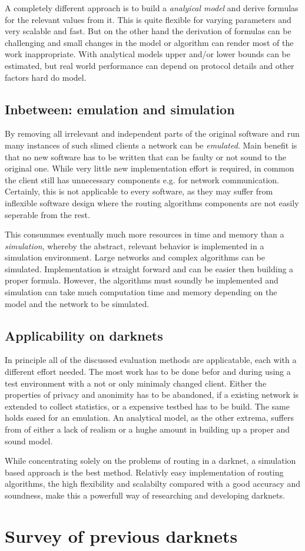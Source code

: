 A completely different approach is to build a \emph{analyical model} and derive formulas for the relevant values from it. This is quite flexible for varying parameters and very scalable and fast. But on the other hand the derivation of formulas can be challenging and small changes in the model or algorithm can render most of the work inappropriate. With analytical models upper and/or lower bounds can be estimated, but real world performance can depend on protocol details and other factors hard do model.

\subsection{Inbetween: emulation and simulation}

By removing all irrelevant and independent parts of the original software and run many instances of such slimed clients a network can be \emph{emulated}. Main benefit is that no new software has to be written that can be faulty or not sound to the original one. While very little new implementation effort is required, in common the client still has unnecessary components e.g. for network communication. Certainly, this is not applicable to every software, as they may suffer from inflexible software design where the routing algorithms components are not easily seperable from the rest.

This consummes eventually much more resources in time and memory than a \emph{simulation}, whereby the abstract, relevant behavior is implemented in a simulation environment. Large networks and complex algorithms can be simulated. Implementation is straight forward and can be easier then building a proper formula. However, the algorithms must soundly be implemented and simulation can take much computation time and memory depending on the model and the network to be simulated.


\subsection{Applicability on darknets}

In principle all of the discussed evaluation methods are applicatable, each with a different effort needed. The most work has to be done befor and during using a test environment with a not or only minimaly changed client. Either the properties of privacy and anonimity has to be abandoned, if a existing network is extended to collect statistics, or a expensive testbed has to be build. The same holds eased for an emulation. An analytical model, as the other extrema, suffers from of either a lack of realism or a hughe amount in building up a proper and sound model.

While concentrating solely on the problems of routing in a darknet, a simulation based approach is the best method. Relativly easy implementation of routing algorithms, the high flexibility and scalabilty compared with a good accuracy and soundness, make this a powerfull way of researching and developing darknets.

\section{Survey of previous darknets}

